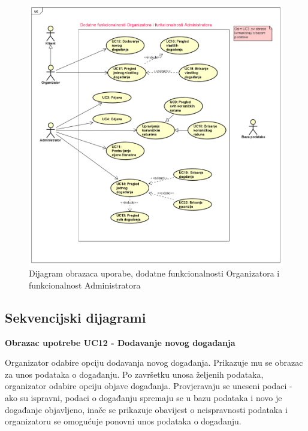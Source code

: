 				\begin{figure}[H]
					\includegraphics[scale=0.5]{dijagrami/uc2.PNG}
					\centering
					\caption{Dijagram obrazaca uporabe, dodatne funkcionalnosti Organizatora i funkcionalnost Administratora}
					\label{fig:promjene}
				\end{figure}
				
				\newpage
				
			\subsection{Sekvencijski dijagrami}
			
				\noindent \textbf{Obrazac upotrebe UC12 - Dodavanje novog događanja}
				
				\noindent Organizator odabire opciju dodavanja novog događanja. Prikazuje mu se obrazac za unos podataka o događanju. Po završetku unosa željenih podataka, organizator odabire opciju objave događanja. Provjeravaju se uneseni podaci - ako su ispravni, podaci o događanju spremaju se u bazu podataka i novo je događanje objavljeno, inače se prikazuje obavijest o neispravnosti podataka i organizatoru se omogućuje ponovni unos podataka o događanju. 
				
